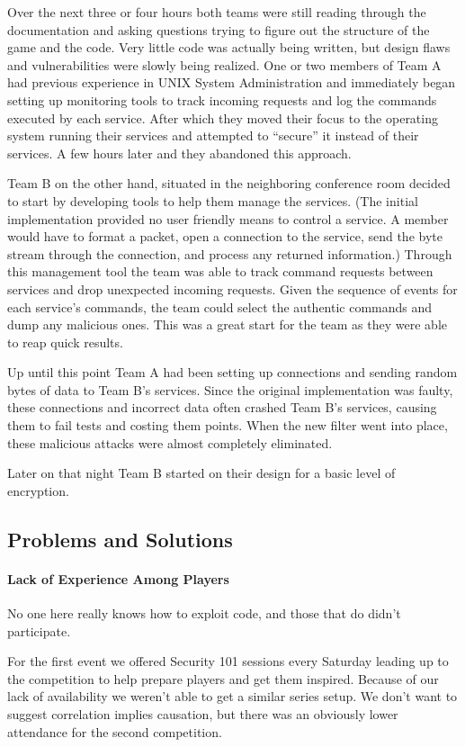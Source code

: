 \documentclass[10pt]{article}
\begin{document}
Over the next three or four hours both teams were still reading through the
documentation and asking questions trying to figure out the structure of the
game and the code. Very little code was actually being written, but design flaws
and vulnerabilities were slowly being realized. One or two members of Team A
had previous experience in UNIX System Administration and immediately began
setting up monitoring tools to track incoming requests and log the commands
executed by each service. After which they moved their focus to the operating
system running their services and attempted to ``secure'' it instead of their
services. A few hours later and they abandoned this approach.

Team B on the other hand, situated in the neighboring conference room decided to
start by developing tools to help them manage the services. (The initial
implementation provided no user friendly means to control a service. A member
would have to format a packet, open a connection to the service, send the
byte stream through the connection, and process any returned information.)
Through this management tool the team was able to track command requests between
services and drop unexpected incoming requests. Given the sequence of events for
each service's commands, the team could select the authentic commands and dump
any malicious ones. This was a great start for the team as they were able to
reap quick results.

Up until this point Team A had been setting up connections and sending random
bytes of data to Team B's services. Since the original implementation was
faulty, these connections and incorrect data often crashed Team B's services,
causing them to fail tests and costing them points. When the new filter went
into place, these malicious attacks were almost completely eliminated.

Later on that night Team B started on their design for a basic level of
encryption. 

\subsection{Problems and Solutions}
\paragraph*{Lack of Experience Among Players} No one here really knows how to
exploit code, and those that do didn't participate.

For the first event we offered Security 101 sessions every Saturday leading up
to the competition to help prepare players and get them inspired. Because of
our lack of availability we weren't able to get a similar series setup. We
don't want to suggest correlation implies causation, but there was an obviously
lower attendance for the second competition.
\end{document}

